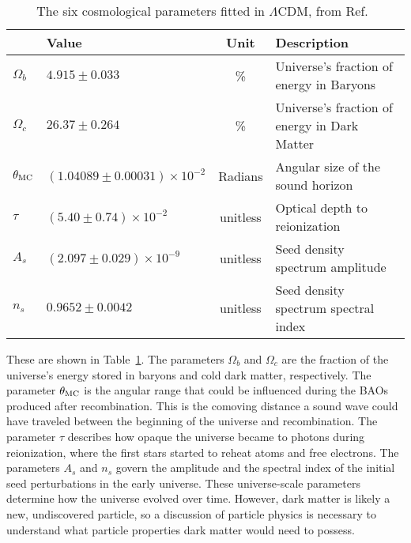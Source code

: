   \begin{table}[]
    \centering
    \caption[6 Cosmological Parameters]{
      The six cosmological parameters fitted in $\Lambda$CDM, from Ref.~\cite{planck_dm_limit}}
    \label{tab:six_params}
    \begin{tabular}{llcl}
               & \textbf{Value}                 & \textbf{Unit} & \textbf{Description} \\
    \hline 
    $\Omega_b$ & $ 4.915  \pm0.033                 $ & \%   & Universe's fraction of energy in Baryons \\

    $\Omega_c$ & $ 26.37  \pm0.264                 $ & \%   & Universe's fraction of energy in Dark Matter \\

    $\theta_{\textrm{MC}}$ & $(1.04089\pm0.00031)\times 10^{-2}$ & Radians & Angular size of the sound horizon \\

    $\tau$     & $(5.40   \pm0.74   )\times 10^{-2}$ & unitless  & Optical depth to reionization\\

    $A_s$      & $(2.097  \pm0.029  )\times 10^{-9}$ & unitless   & Seed density spectrum amplitude \\

    $n_s$      & $ 0.9652 \pm0.0042                $ & unitless   & Seed density spectrum spectral index \\
    \hline 
    \end{tabular}
  \end{table}
  
  These are shown in Table~\ref{tab:six_params}.
  The parameters $\Omega_b$ and $\Omega_c$ are the fraction of the universe's energy stored in baryons and cold dark matter, respectively.
  The parameter $\theta_{\textrm{MC}}$ is the angular range that could be influenced during the BAOs produced after recombination.
  This is the comoving distance a sound wave could have traveled between the beginning of the universe and recombination.
  The parameter $\tau$ describes how opaque the universe became to photons during reionization, where the first stars started to reheat atoms and free electrons.
  The parameters $A_s$ and $n_s$ govern the amplitude and the spectral index of the initial seed perturbations in the early universe.
  These universe-scale parameters determine how the universe evolved over time.
  However, dark matter is likely a new, undiscovered particle,  so a discussion of particle physics is necessary to understand what particle properties dark matter would need to possess.
  

